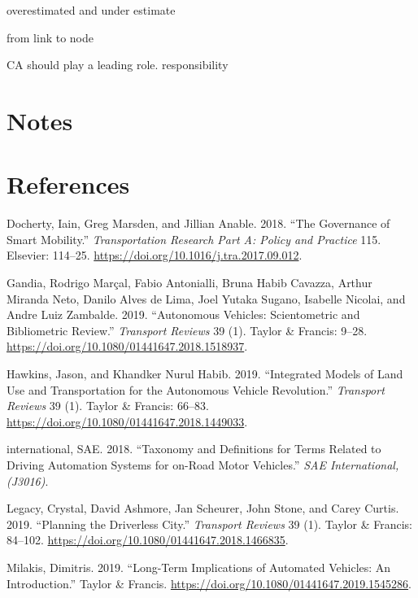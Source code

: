 \documentclass[12pt,]{article}
\begin{document}
overestimated and under estimate

from link to node

CA should play a leading role. responsibility

\hypertarget{notes}{%
\section{Notes}\label{notes}}

\hypertarget{references}{%
\section*{References}\label{references}}

\hypertarget{refs}{}
\leavevmode\hypertarget{ref-docherty2018governance}{}%
Docherty, Iain, Greg Marsden, and Jillian Anable. 2018. ``The Governance
of Smart Mobility.'' \emph{Transportation Research Part A: Policy and
Practice} 115. Elsevier: 114--25.
\url{https://doi.org/10.1016/j.tra.2017.09.012}.

\leavevmode\hypertarget{ref-gandia2019autonomous}{}%
Gandia, Rodrigo Marçal, Fabio Antonialli, Bruna Habib Cavazza, Arthur
Miranda Neto, Danilo Alves de Lima, Joel Yutaka Sugano, Isabelle
Nicolai, and Andre Luiz Zambalde. 2019. ``Autonomous Vehicles:
Scientometric and Bibliometric Review.'' \emph{Transport Reviews} 39
(1). Taylor \& Francis: 9--28.
\url{https://doi.org/10.1080/01441647.2018.1518937}.

\leavevmode\hypertarget{ref-hawkins2019integrated}{}%
Hawkins, Jason, and Khandker Nurul Habib. 2019. ``Integrated Models of
Land Use and Transportation for the Autonomous Vehicle Revolution.''
\emph{Transport Reviews} 39 (1). Taylor \& Francis: 66--83.
\url{https://doi.org/10.1080/01441647.2018.1449033}.

\leavevmode\hypertarget{ref-sae2018taxonomy}{}%
international, SAE. 2018. ``Taxonomy and Definitions for Terms Related
to Driving Automation Systems for on-Road Motor Vehicles.'' \emph{SAE
International,(J3016)}.

\leavevmode\hypertarget{ref-legacy2019planning}{}%
Legacy, Crystal, David Ashmore, Jan Scheurer, John Stone, and Carey
Curtis. 2019. ``Planning the Driverless City.'' \emph{Transport Reviews}
39 (1). Taylor \& Francis: 84--102.
\url{https://doi.org/10.1080/01441647.2018.1466835}.

\leavevmode\hypertarget{ref-milakis2019long}{}%
Milakis, Dimitris. 2019. ``Long-Term Implications of Automated Vehicles:
An Introduction.'' Taylor \& Francis.
\url{https://doi.org/10.1080/01441647.2019.1545286}.
\end{document}
